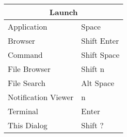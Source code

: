 \documentclass[12pt,paper=landscape,paper=a4]{scrartcl}
\begin{document}
\pagestyle{empty}
\pagecolor{gruvbox_bg} %
\color{gruvbox_fg}

\begin{multicols}{2}

    \begin{tabular}{ll}
         \multicolumn{2}{c}{Launch} \\
         \hline
         Application         & \faWindows{} Space\\
         Browser             & \faWindows{} Shift Enter\\
         Command             & \faWindows{} Shift Space\\
         File Browser        & \faWindows{} Shift n\\
         File Search         & \faWindows{} Alt Space\\
         Notification Viewer & \faWindows{} n\\
         Terminal            & \faWindows{} Enter\\
         This Dialog         & \faWindows{} Shift ?
    \end{tabular}

    \vspace{1em}


\end{multicols}
\end{document}
